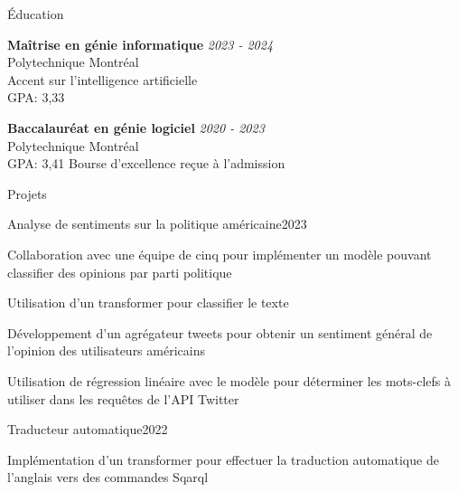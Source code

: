 \documentclass{resume} %
\begin{document}

\begin{rSection}{Éducation}

	{\bf Maîtrise en génie informatique} \hfill {\em 2023 - 2024}
	\\ Polytechnique Montréal
	\\ Accent sur l'intelligence artificielle
	\\ GPA: 3,33

		{\bf Baccalauréat en génie logiciel} \hfill {\em 2020 - 2023}
	\\ Polytechnique Montréal
	\\GPA: 3,41 \hspace{0.5cm}  Bourse d'excellence reçue à l'admission


\end{rSection}

\begin{rSection}{Projets}
	\begin{rSubsection}{Analyse de sentiments sur la politique américaine}{2023}{}{}

		\item Collaboration avec une équipe de cinq pour implémenter un modèle pouvant classifier des opinions par parti politique
		\item Utilisation d'un transformer pour classifier le texte
		\item Développement d'un agrégateur tweets pour obtenir un sentiment général de l'opinion des utilisateurs américains
		\item Utilisation de régression linéaire avec le modèle pour déterminer les mots-clefs à utiliser dans les requêtes de l'API Twitter
	\end{rSubsection}
	\begin{rSubsection}{Traducteur automatique}{2022}{}{}
		\item Implémentation d'un transformer pour effectuer la traduction automatique de l'anglais vers des commandes Sqarql
	\end{rSubsection}

\end{rSection}
\end{document}
